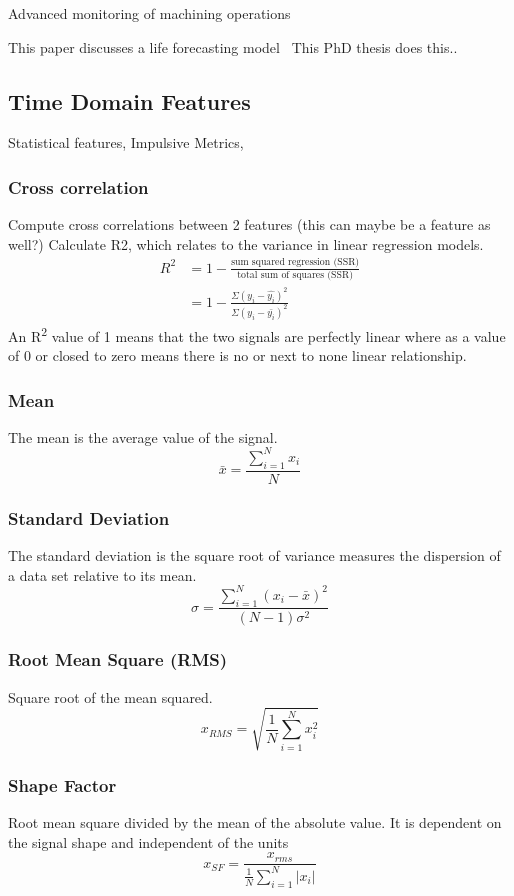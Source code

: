 \documentclass[]{article}
\begin{document}
Advanced monitoring of machining operations~\cite{teti2010advanced}


This paper discusses a life forecasting model~\cite{wang2016multiple}
This PhD thesis does this..~\cite{martin2017unsupervised}

\subsection{Time Domain Features} 	
Statistical features, Impulsive Metrics, 
\subsubsection*{Cross correlation}
Compute cross correlations between 2 features (this can maybe be a feature as well?)
Calculate R2, which relates to the variance in linear regression models.
\begin{align*}
 R^2 &= 1 - \frac{\textrm{sum squared regression (SSR)}}{\textrm{total sum of squares (SSR)}} \\ 
 &= 1 - \frac{\Sigma(y_i - \hat{y_i})^2}{\Sigma(y_i - \bar{y_i})^2} 
\end{align*}
An R\textsuperscript{2} value of 1 means that the two signals are perfectly linear where as a value of 0 or closed to zero means there is no or next to none linear relationship.
\subsubsection*{Mean}
The mean is the average value of the signal.
$$ \bar{x} = \frac{\sum^N_{i=1} x_i}{N} $$
\subsubsection*{Standard Deviation}  
The standard deviation is the square root of variance measures the dispersion of a data set relative to its mean. 
$$ \sigma =\frac{\sum^N_{i=1}(x_i-\bar{x})^2}{(N-1)\sigma^2} $$
\subsubsection*{Root Mean Square (\gls{RMS})}
Square root of the mean squared.
$$ x_{RMS} = \sqrt{\frac{1}{N} \sum^N_{i=1}x^2_i} $$
\subsubsection*{Shape Factor}
Root mean square divided by the mean of the absolute value. It is dependent on the signal shape and independent of the units
$$ x_{SF} = \frac{ x_{rms} }  {\frac{1}{N}\sum^N_{i=1}|x_i|} $$
\end{document}
